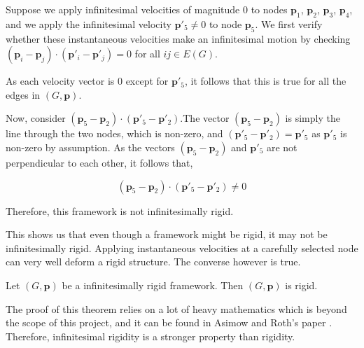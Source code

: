 \begin{flushleft}
Suppose we apply infinitesimal velocities of magnitude $0$ to nodes $\mathbf{p}_1$, $\mathbf{p}_2$, $\mathbf{p}_3$, $\mathbf{p}_4$, and we apply the infinitesimal velocity $\mathbf{p}'_5 \neq 0$ to node $\mathbf{p}_5$. We first verify whether these instantaneous velocities make an infinitesimal motion by checking $(\mathbf{p}_i - \mathbf{p}_j) \cdot (\mathbf{p}'_i - \mathbf{p}'_j) = 0$ for all $ij \in E(G)$. 

As each velocity vector is $0$ except for $\mathbf{p}'_5$, it follows that this is true for all the edges in $(G,\mathbf{p})$.
\end{flushleft}

\begin{flushleft}
Now, consider $(\mathbf{p}_5 - \mathbf{p}_2) \cdot (\mathbf{p}'_5 - \mathbf{p}'_2)$.The vector $(\mathbf{p}_5 - \mathbf{p}_2)$ is simply the line through the two nodes, which is non-zero, and $(\mathbf{p}'_5 - \mathbf{p}'_2) = \mathbf{p}'_5$ as $\mathbf{p}'_5$ is non-zero by assumption. As the vectors $(\mathbf{p}_5 - \mathbf{p}_2)$ and $\mathbf{p}'_5$ are not perpendicular to each other, it follows that,

\[
(\mathbf{p}_5 - \mathbf{p}_2) \cdot (\mathbf{p}'_5 - \mathbf{p}'_2) \neq 0
\]
\end{flushleft}

\begin{flushleft}
Therefore, this framework is not infinitesimally rigid. 
\end{flushleft}

\begin{flushleft}
This shows us that even though a framework might be rigid, it may not be infinitesimally rigid. Applying instantaneous velocities at a carefully selected node can very well deform a rigid structure. The converse however is true.
\end{flushleft}

\begin{theorem}
Let $(G,\mathbf{p})$ be a infinitesimally rigid framework. Then $(G,\mathbf{p})$ is rigid.
\end{theorem}

\begin{flushleft}
The proof of this theorem relies on a lot of heavy mathematics which is beyond the scope of this project, and it can be found in Asimow and Roth's paper \cite{asimow}. Therefore, infinitesimal rigidity is a stronger property than rigidity. 
\end{flushleft}

